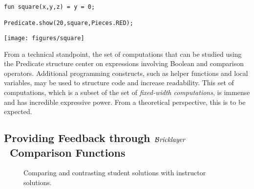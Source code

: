 \documentclass[submission,copyright,creativecommons]{eptcs}
\newcommand{\bricklayer}{\ensuremath{\mathcal{B}\emph{ricklayer}}}
\begin{document}
\medskip
\begin{minipage}[b]{3in}
\begin{lstlisting}
fun square(x,y,z) = y = 0;

Predicate.show(20,square,Pieces.RED);
\end{lstlisting}
\end{minipage}
\hspace*{5mm}
\begin{minipage}{2in}
\texttt{[image: figures/square]}
\end{minipage}


\medskip

From a technical standpoint, the set of computations that can be studied using the Predicate structure center on expressions involving Boolean and comparison operators. Additional programming constructs, such as helper functions and local variables, may be used to structure code and increase readability. This set of computations, which is a subset of the set of \emph{fixed-width computations}, is immense and has incredible expressive power. From a theoretical perspective, this is to be expected.

\subsection{Providing Feedback through \bricklayer\ Comparison Functions}




\begin{figure*}[htb!]
\centering
{}



\caption{Comparing and contrasting student solutions with instructor solutions.}\label{fig-predicate-comparisons}
\end{figure*}
\end{document}

